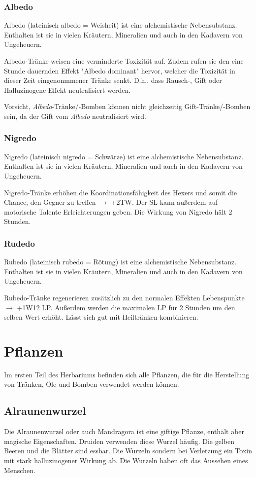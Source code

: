 \subsubsection{Albedo}
Albedo (lateinisch albedo = Weisheit) ist eine alchemistische Nebensubstanz. Enthalten ist sie in vielen Kräutern, Mineralien und auch in den Kadavern von Ungeheuern.

Albedo-Tränke weisen eine verminderte Toxizität auf. Zudem rufen sie den eine Stunde dauernden Effekt "Albedo dominant" hervor, welcher die Toxizität in dieser Zeit eingenonmmener Tränke senkt. D.h., dass Rausch-, Gift oder Halluzinogene Effekt neutralisiert werden. 

Vorsicht, \textit{Albedo}-Tränke/-Bomben können nicht gleichzeitig Gift-Tränke/-Bomben sein, da der Gift vom \textit{Albedo} neutralisiert wird.

\subsubsection{Nigredo}
Nigredo (lateinisch nigredo = Schwärze) ist eine alchemistische Nebensubstanz. Enthalten ist sie in vielen Kräutern, Mineralien und auch in den Kadavern von Ungeheuern.

Nigredo-Tränke erhöhen die Koordinationsfähigkeit des Hexers und somit die Chance, den Gegner zu treffen $\rightarrow$ +2TW. Der SL kann außerdem auf motorische Talente Erleichterungen geben. Die Wirkung von Nigredo hält 2 Stunden.

\subsubsection{Rudedo}
Rubedo (lateinisch rubedo = Rötung) ist eine alchemistische Nebensubstanz. Enthalten ist sie in vielen Kräutern, Mineralien und auch in den Kadavern von Ungeheuern.

Rubedo-Tränke regenerieren zusätzlich zu den normalen Effekten Lebenspunkte $\rightarrow$ +1W12 LP. Außerdem werden die maximalen LP für 2 Stunden um den selben Wert erhöht. Lässt sich gut mit Heiltränken kombinieren.


\section{Pflanzen}
Im ersten Teil des Herbariums befinden sich alle Pflanzen, die für die Herstellung von Tränken, Öle und Bomben verwendet werden können.

\subsection{Alraunenwurzel}
Die Alraunenwurzel oder auch Mandragora ist eine giftige Pflanze, enthält aber magische Eigenschaften. Druiden verwenden diese Wurzel häufig. Die gelben Beeren und die Blätter sind essbar. Die Wurzeln sondern bei Verletzung ein Toxin mit stark halluzinogener Wirkung ab. Die Wurzeln haben oft das Aussehen eines Menschen.

